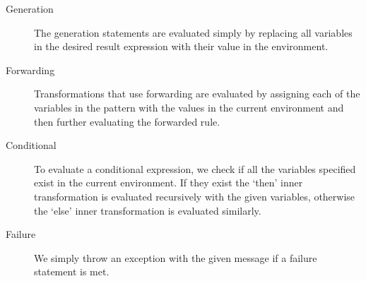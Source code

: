 \begin{description}
  \item[Generation] The generation statements are evaluated simply
    by replacing all variables in the desired result expression with their 
    value in the environment. 
  \item[Forwarding] Transformations that use forwarding are evaluated by
    assigning each of the variables in the pattern with the values in the
    current environment and then further evaluating the forwarded rule.
  \item[Conditional] To evaluate a conditional expression, we check if all
    the variables specified exist in the current environment.
    If they exist the `then' inner transformation is evaluated recursively
    with the given variables, otherwise the `else' inner transformation
    is evaluated similarly.
  \item[Failure] We simply throw an exception with the given message
    if a failure statement is met.
\end{description}
